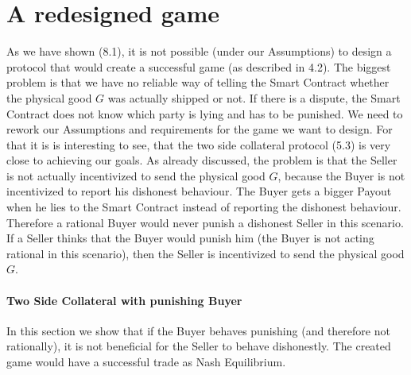 \documentclass{cacthesis}
\begin{document}
\chapter{A redesigned game}
As we have shown (8.1), it is not possible (under our Assumptions) to design a protocol that would create a successful game (as described in 4.2). The biggest problem is that we have no reliable way of telling the Smart Contract whether the physical good $G$ was actually shipped or not. If there is a dispute, the Smart Contract does not know which party is lying and has to be punished.\newline
We need to rework our Assumptions and requirements for the game we want to design. For that it is is interesting to see, that the two side collateral protocol (5.3) is very close to achieving our goals. As already discussed, the problem is that the Seller is not actually incentivized to send the physical good $G$, because the Buyer is not incentivized to report his dishonest behaviour. The Buyer gets a bigger Payout when he lies to the Smart Contract instead of reporting the dishonest behaviour. Therefore a rational Buyer would never punish a dishonest Seller in this scenario. If a Seller thinks that the Buyer would punish him (the Buyer is not acting rational in this scenario), then the Seller is incentivized to send the physical good $G$.\newline
\subsubsection{Two Side Collateral with punishing Buyer}
In this section we show that if the Buyer behaves punishing (and therefore not rationally), it is not beneficial for the Seller to behave dishonestly. The created game would have a successful trade as Nash Equilibrium.\newline
\end{document}
